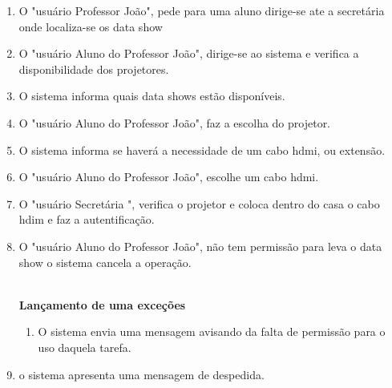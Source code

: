 \begin{enumerate}

  \item O "usuário Professor João", pede para uma aluno dirige-se ate a
    secretária onde localiza-se os data show 
  
  \item O "usuário Aluno do Professor João", dirige-se ao sistema e verifica a
    disponibilidade dos projetores.  

  \item O sistema informa quais data shows estão disponíveis. 

  \item O "usuário Aluno do Professor João", faz a escolha do projetor.

  \item O sistema informa se haverá a necessidade de um cabo hdmi, ou extensão.

  \item O "usuário Aluno do Professor João", escolhe um cabo hdmi.

  \item O "usuário Secretária ", verifica o projetor e coloca dentro do casa o
    cabo hdim e faz a autentificação.

  \item O "usuário Aluno do Professor João", não tem permissão para leva o data
    show o sistema cancela a operação.

\\
    \textbf{Lançamento de uma exceções}
\\
    \begin{enumerate}

      \item O sistema envia uma mensagem avisando da falta de permissão 
      para o uso daquela tarefa. 
    
    \end{enumerate}
    
  
  \item o sistema apresenta uma mensagem de despedida. 
 

\end{enumerate}


\newpage
